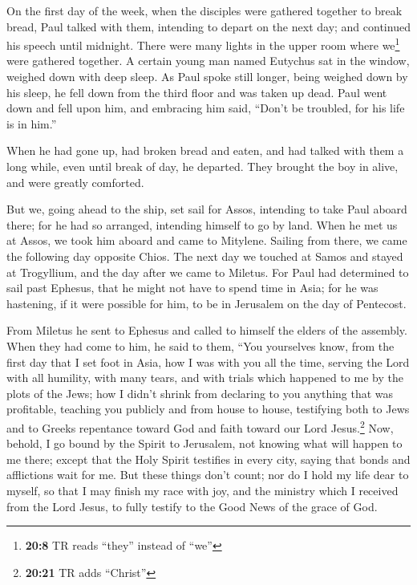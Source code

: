  On the first day of the week, when the disciples were
gathered together to break bread, Paul talked with them, intending to
depart on the next day; and continued his speech until midnight.
 There were many lights in the upper room where
we\footnote{\textbf{20:8} TR reads ``they'' instead of ``we''} were
gathered together.  A certain young man named Eutychus sat
in the window, weighed down with deep sleep. As Paul spoke still longer,
being weighed down by his sleep, he fell down from the third floor and
was taken up dead.  Paul went down and fell upon him, and
embracing him said, ``Don't be troubled, for his life is in him.''

 When he had gone up, had broken bread and eaten, and had
talked with them a long while, even until break of day, he departed.
 They brought the boy in alive, and were greatly
comforted.

 But we, going ahead to the ship, set sail for Assos,
intending to take Paul aboard there; for he had so arranged, intending
himself to go by land.  When he met us at Assos, we took
him aboard and came to Mitylene.  Sailing from there, we
came the following day opposite Chios. The next day we touched at Samos
and stayed at Trogyllium, and the day after we came to Miletus.
 For Paul had determined to sail past Ephesus, that he
might not have to spend time in Asia; for he was hastening, if it were
possible for him, to be in Jerusalem on the day of Pentecost.

 From Miletus he sent to Ephesus and called to himself
the elders of the assembly.  When they had come to him,
he said to them, ``You yourselves know, from the first day that I set
foot in Asia, how I was with you all the time,  serving
the Lord with all humility, with many tears, and with trials which
happened to me by the plots of the Jews;  how I didn't
shrink from declaring to you anything that was profitable, teaching you
publicly and from house to house,  testifying both to
Jews and to Greeks repentance toward God and faith toward our Lord
Jesus.\footnote{\textbf{20:21} TR adds ``Christ''}  Now,
behold, I go bound by the Spirit to Jerusalem, not knowing what will
happen to me there;  except that the Holy Spirit
testifies in every city, saying that bonds and afflictions wait for me.
 But these things don't count; nor do I hold my life dear
to myself, so that I may finish my race with joy, and the ministry which
I received from the Lord Jesus, to fully testify to the Good News of the
grace of God.

